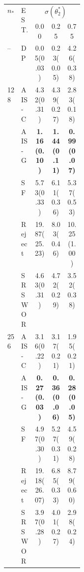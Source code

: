 \begin{tabular}{p{0.05\linewidth}p{0.13\linewidth}ccc}
  \toprule
  \multirow{2}{*}{$n_*$} & \multirow{2}{*}{EST.}& \multicolumn{3}{c}{$\sigma(\theta^*_2)$}         \\
  \cmidrule{3-5}
                         &                      & 0.00                & 0.25                & 0.75                \\
  \midrule
  \multirow{1}{*}{--}    & DP                   & {0.05(0.03)}        & {0.23(0.05)}        & {4.26(0.38)}        \\
  \midrule
  \multirow{5}{*}{128}   & AIS-C                & {4.32(0.31)}        & {4.39(0.27)}        & {2.83(0.18)}        \\
                         & AIS-G                & \textbf{1.16(0.10)} & \textbf{1.44(0.11)} & \textbf{0.99(0.07)} \\
                         & SF                   & {5.73(0.33)}        & {6.11(0.36)}        & {5.37(0.53)}        \\
                         & Reject               & {19.87(25.23)}      & {8.03(0.46)}        & {10.25(1.00)}       \\
                         & SRSWOR               & {4.63(0.31)}        & {4.72(0.29)}        & {3.52(0.38)}        \\
  \midrule
  \multirow{5}{*}{256}   & AIS-C                & {3.16(0.22)}        & {3.17(0.21)}        & {1.95(0.21)}        \\
                         & AIS-G                & \textbf{0.27(0.03)} & \textbf{0.36(0.06)} & \textbf{0.28(0.05)} \\
                         & SF                   & {4.97(0.30)}        & {5.27(0.31)}        & {4.59(0.28)}        \\
                         & Reject               & {19.18(26.07)}      & {6.85(0.33)}        & {8.79(0.60)}        \\
                         & SRSWOR               & {3.97(0.28)}        & {4.01(0.27)}        & {2.98(0.24)}        \\
  \bottomrule
\end{tabular}
